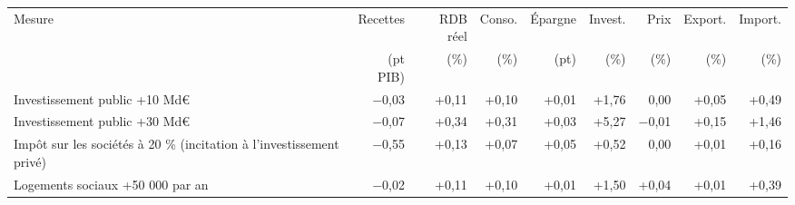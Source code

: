 \begin{tabular}{p{5.0cm}rrrrrrrr}
\toprule
Mesure & Recettes & RDB réel & Conso. & Épargne & Invest. & Prix & Export. & Import. \\
 & (pt PIB) & (\%) & (\%) & (pt) & (\%) & (\%) & (\%) & (\%) \\
\midrule
Investissement public +10 Md€ & $-$0{,}03 & +0{,}11 & +0{,}10 & +0{,}01 & +1{,}76 & 0{,}00 & +0{,}05 & +0{,}49 \\
Investissement public +30 Md€ & $-$0{,}07 & +0{,}34 & +0{,}31 & +0{,}03 & +5{,}27 & $-$0{,}01 & +0{,}15 & +1{,}46 \\
Impôt sur les sociétés à 20 \% (incitation à l'investissement privé) & $-$0{,}55 & +0{,}13 & +0{,}07 & +0{,}05 & +0{,}52 & 0{,}00 & +0{,}01 & +0{,}16 \\
Logements sociaux +50 000 par an & $-$0{,}02 & +0{,}11 & +0{,}10 & +0{,}01 & +1{,}50 & +0{,}04 & +0{,}01 & +0{,}39 \\
\bottomrule
\end{tabular}
